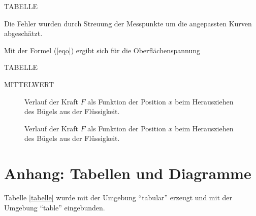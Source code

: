 \documentclass[11pt,a4paper]{article}
\begin{document}
TABELLE

Die Fehler wurden durch Streuung der Messpunkte um die angepassten Kurven abgesch\"atzt.

Mit der Formel (\ref{eqo}) ergibt sich f\"ur die Oberfl\"achenspannung 

TABELLE

MITTELWERT

\begin{figure}[p]
\centering
{}
\caption{Verlauf der Kraft $F$ als Funktion der Position $x$ beim Herausziehen des B\"ugels aus der Fl\"ussigkeit.}
\label{abbildung}
\end{figure}

\begin{figure}[p]
\centering
{}
\caption{Verlauf der Kraft $F$ als Funktion der Position $x$ beim Herausziehen des B\"ugels aus der Fl\"ussigkeit.}
\label{abbildung}
\end{figure}


\section{Anhang: Tabellen und Diagramme}

Tabelle \ref{tabelle} wurde mit der Umgebung "`tabular"' erzeugt
und mit der Umgebung "`table"' eingebunden.  



\end{document}
